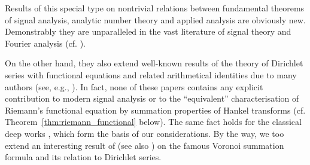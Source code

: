 \documentclass[11pt]{article}
\theoremstyle{plain}
\begin{document}
Results of this special type on nontrivial relations between fundamental theorems of signal analysis, analytic number theory and applied analysis are obviously new. Demonstrably they are unparalleled in the vast literature of signal theory and Fourier analysis (cf. \cite{8,21}).

On the other hand, they also extend well-known results of the theory of Dirichlet series with functional equations and related arithmetical identities due to many authors (see, e.g., \cite{2,3,4,11,12,13,14,22}). In fact, none of these papers contains any explicit contribution to modern signal analysis or to the ``equivalent'' characterisation of Riemann's functional equation by summation properties of Hankel transforms (cf. Theorem~\ref{thm:riemann_functional} below). The same fact holds for the classical deep works \cite{15,17,19,20,27,29}, which form the basis of our considerations. By the way, we too extend an interesting result of \cite{18} (see also \cite{1,26}) on the famous Voronoi summation formula and its relation to Dirichlet series.
\end{document}
